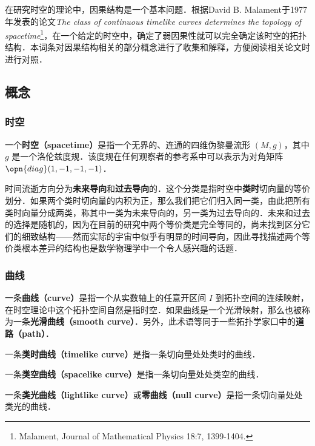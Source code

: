 



在研究时空的理论中，因果结构是一个基本问题．根据David B. Malament于1977年发表的论文\textsl{The class of continuous timelike curves determines the topology of spacetime}\footnote{Malament, Journal of Mathematical Physics 18:7, 1399-1404. }，在一个给定的时空中，确定了弱因果性就可以完全确定该时空的拓扑结构．本词条对因果结构相关的部分概念进行了收集和解释，方便阅读相关论文时进行对照．

\subsection{概念}

\subsubsection{时空}

一个\textbf{时空（spacetime）}是指一个无界的、连通的四维伪黎曼流形 $(M, g)$，其中 $g$ 是一个洛伦兹度规．该度规在任何观察者的参考系中可以表示为对角矩阵 $\opn{diag}(1, -1, -1, -1)$．

时间流逝方向分为\textbf{未来导向}和\textbf{过去导向}的．这个分类是指时空中\textbf{类时}切向量的等价划分．如果两个类时切向量的内积为正，那么我们把它们归入同一类，由此把所有类时向量分成两类，称其中一类为未来导向的，另一类为过去导向的．未来和过去的选择是随机的，因为在目前的研究中两个等价类是完全等同的，尚未找到区分它们的细致结构——然而实际的宇宙中似乎有明显的时间导向，因此寻找描述两个等价类根本差异的结构也是数学物理学中一个令人感兴趣的话题．

\subsubsection{曲线}

一条\textbf{曲线（curve）}是指一个从实数轴上的任意开区间 $I$ 到拓扑空间的连续映射，在时空理论中这个拓扑空间自然是指时空．如果曲线是一个光滑映射，那么也被称为一条\textbf{光滑曲线（smooth curve）}．另外，此术语等同于一些拓扑学家口中的\textbf{道路（path）}．

一条\textbf{类时曲线（timelike curve）}是指一条切向量处处类时的曲线．

一条\textbf{类空曲线（spacelike curve）}是指一条切向量处处类空的曲线．

一条\textbf{类光曲线（lightlike curve）}或\textbf{零曲线（null curve）}是指一条切向量处处类光的曲线．

